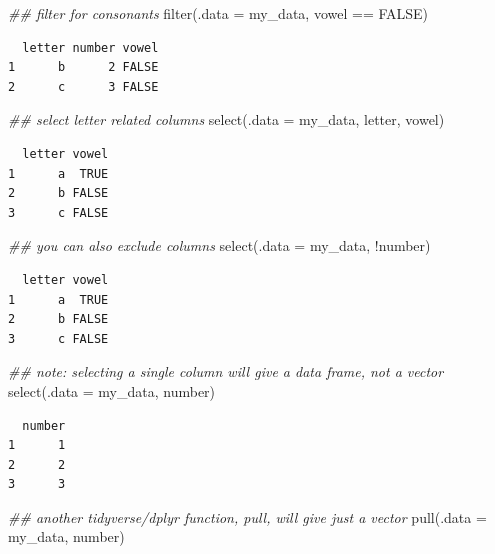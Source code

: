 \documentclass[
  letterpaper,
  DIV=11,
  numbers=noendperiod]{scrreprt}
\newenvironment{Shaded}{\begin{snugshade}}{\end{snugshade}}
\newcommand{\AttributeTok}[1]{\textcolor[rgb]{0.40,0.45,0.13}{#1}}
\newcommand{\ConstantTok}[1]{\textcolor[rgb]{0.56,0.35,0.01}{#1}}
\newcommand{\DocumentationTok}[1]{\textcolor[rgb]{0.37,0.37,0.37}{\textit{#1}}}
\newcommand{\FunctionTok}[1]{\textcolor[rgb]{0.28,0.35,0.67}{#1}}
\newcommand{\NormalTok}[1]{\textcolor[rgb]{0.00,0.23,0.31}{#1}}
\newcommand{\SpecialCharTok}[1]{\textcolor[rgb]{0.37,0.37,0.37}{#1}}
\begin{document}
\begin{Shaded}
\begin{Highlighting}[]
\DocumentationTok{\#\# filter for consonants}
\FunctionTok{filter}\NormalTok{(}\AttributeTok{.data =}\NormalTok{ my\_data, vowel }\SpecialCharTok{==} \ConstantTok{FALSE}\NormalTok{)}
\end{Highlighting}
\end{Shaded}

\begin{verbatim}
  letter number vowel
1      b      2 FALSE
2      c      3 FALSE
\end{verbatim}

\begin{Shaded}
\begin{Highlighting}[]
\DocumentationTok{\#\# select letter related columns}
\FunctionTok{select}\NormalTok{(}\AttributeTok{.data =}\NormalTok{ my\_data, letter, vowel)}
\end{Highlighting}
\end{Shaded}

\begin{verbatim}
  letter vowel
1      a  TRUE
2      b FALSE
3      c FALSE
\end{verbatim}

\begin{Shaded}
\begin{Highlighting}[]
\DocumentationTok{\#\# you can also exclude columns}
\FunctionTok{select}\NormalTok{(}\AttributeTok{.data =}\NormalTok{ my\_data, }\SpecialCharTok{!}\NormalTok{number)}
\end{Highlighting}
\end{Shaded}

\begin{verbatim}
  letter vowel
1      a  TRUE
2      b FALSE
3      c FALSE
\end{verbatim}

\begin{Shaded}
\begin{Highlighting}[]
\DocumentationTok{\#\# note: selecting a single column will give a data frame, not a vector}
\FunctionTok{select}\NormalTok{(}\AttributeTok{.data =}\NormalTok{ my\_data, number)}
\end{Highlighting}
\end{Shaded}

\begin{verbatim}
  number
1      1
2      2
3      3
\end{verbatim}

\begin{Shaded}
\begin{Highlighting}[]
\DocumentationTok{\#\# another tidyverse/dplyr function, pull, will give just a vector}
\FunctionTok{pull}\NormalTok{(}\AttributeTok{.data =}\NormalTok{ my\_data, number)}
\end{Highlighting}
\end{Shaded}
\end{document}
